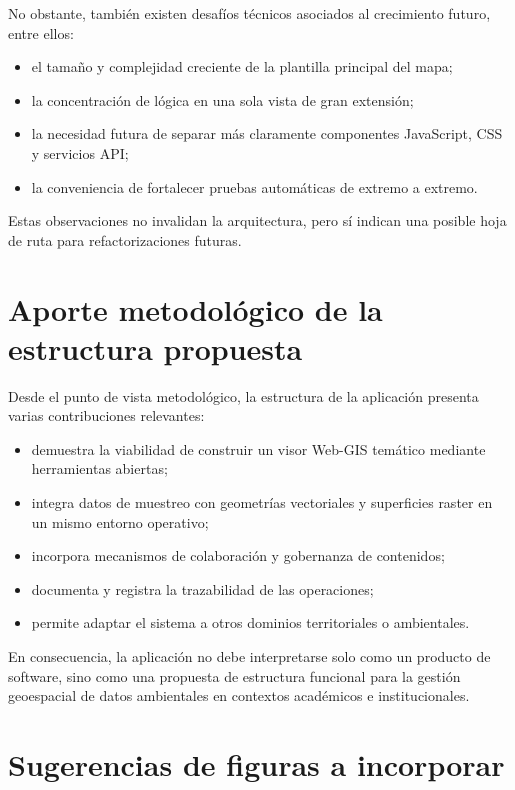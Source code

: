 \documentclass[12pt,a4paper]{report}
\begin{document}
No obstante, tambi\'en existen desaf\'ios t\'ecnicos asociados al crecimiento futuro, entre ellos:

\begin{itemize}
    \item el tama\~no y complejidad creciente de la plantilla principal del mapa;
    \item la concentraci\'on de l\'ogica en una sola vista de gran extensi\'on;
    \item la necesidad futura de separar m\'as claramente componentes JavaScript, CSS y servicios API;
    \item la conveniencia de fortalecer pruebas autom\'aticas de extremo a extremo.
\end{itemize}

Estas observaciones no invalidan la arquitectura, pero s\'i indican una posible hoja de ruta para refactorizaciones futuras.

\section{Aporte metodol\'ogico de la estructura propuesta}

Desde el punto de vista metodol\'ogico, la estructura de la aplicaci\'on presenta varias contribuciones relevantes:

\begin{itemize}
    \item demuestra la viabilidad de construir un visor Web-GIS tem\'atico mediante herramientas abiertas;
    \item integra datos de muestreo con geometr\'ias vectoriales y superficies raster en un mismo entorno operativo;
    \item incorpora mecanismos de colaboraci\'on y gobernanza de contenidos;
    \item documenta y registra la trazabilidad de las operaciones;
    \item permite adaptar el sistema a otros dominios territoriales o ambientales.
\end{itemize}

En consecuencia, la aplicaci\'on no debe interpretarse solo como un producto de software, sino como una propuesta de estructura funcional para la gesti\'on geoespacial de datos ambientales en contextos acad\'emicos e institucionales.

\section{Sugerencias de figuras a incorporar}
\end{document}
